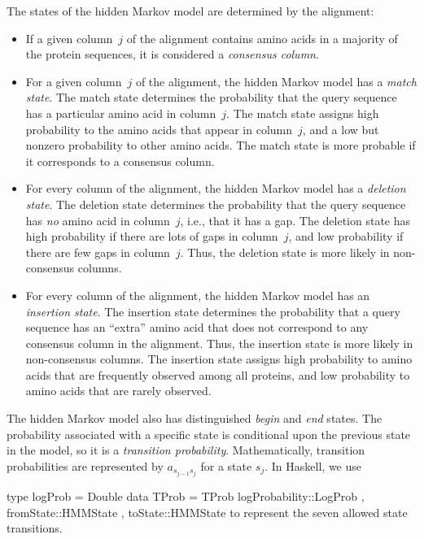 \documentclass[preprint,nonatbib,blockstyle,nocopyrightspace,times]{sigplanconf}
\newenvironment{smallverbatim}{\par\small\verbatim}{\endverbatim}
\begin{document}
The states of the hidden Markov model are determined by the alignment:
\begin{itemize}
\item
If a given column~$j$ of the alignment contains amino acids in a majority
of the protein sequences, it is considered a \textit{consensus column}.
\item
For a given column~$j$ of the alignment, the hidden Markov model has a
\emph{match state}.
The match state determines the probability that the query sequence
has a particular amino acid in column~$j$.
The match state assigns high probability to the amino acids that
appear in column~$j$, and a low but nonzero probability to other amino
acids.
The match state is more probable if it corresponds to a consensus column.
\item
For every column of the alignment, the hidden Markov model has a
\emph{deletion state}.
The deletion state determines the probability that the query sequence
has \emph{no} amino acid  in column~$j$, i.e., that it has a gap.
The deletion state has high probability if there are lots of gaps in
column~$j$, and low probability if there are few gaps in column~$j$.
Thus, the deletion state is more likely in non-consensus columns.
\item
For every column of the alignment, the hidden Markov model has an
\emph{insertion state}.
The insertion state determines the probability that a query sequence
has an ``extra'' amino acid that does not correspond to any
consensus column in the alignment.
Thus, the insertion state is more likely in non-consensus columns.
The insertion state assigns high probability to amino acids that are
frequently observed among all proteins, and low probability to amino acids
that are rarely observed.
\end{itemize}
The hidden Markov model also has distinguished \emph{begin} and \emph{end} states.
The probability associated with a specific state is conditional upon the previous
state in the model, so it is a \textit{transition probability}.
Mathematically, transition probabilities are represented by $a_{s_{j-1}s_{j}}$
for a state $s_{j}$.
In Haskell, we use 
\begin{smallverbatim}
type logProb = Double
data TProb  = TProb { logProbability::LogProb
                    , fromState::HMMState
                    , toState::HMMState
                    }
\end{smallverbatim}
to represent the seven allowed state transitions.
\end{document}
